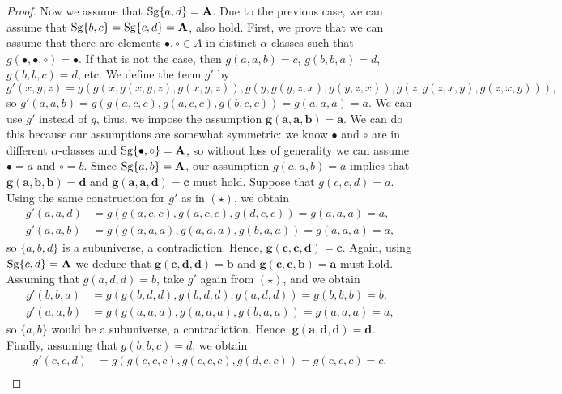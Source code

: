 \documentclass[11pt]{amsart}
\newcommand{\m}[1]{\mathbf{\uppercase{#1}}}
\theoremstyle{definition}
\theoremstyle{remark}
\theoremstyle{plain}
\begin{document}
\begin{proof}
Now we assume that $\mathrm{Sg}\{a,d\}=\m a$. Due to the previous case, we can assume that $\mathrm{Sg}\{b,c\}=\mathrm{Sg}\{c,d\}=\m a$, also hold. First, we prove that we can assume that there are elements $\bullet,\circ\in A$ in distinct $\alpha$-classes such that $g(\bullet,\bullet,\circ)=\bullet$. If that is not the case, then $g(a,a,b)=c$, $g(b,b,a)=d$, $g(b,b,c)=d$, etc. We define the term $g'$ by 
\begin{equation*}\tag{$\star$}
g'(x,y,z)=g(g(x,g(x,y,z),g(x,y,z)),g(y,g(y,z,x),g(y,z,x)),g(z,g(z,x,y),g(z,x,y))),
\end{equation*}
so $g'(a,a,b)=g(g(a,c,c),g(a,c,c),g(b,c,c))=g(a,a,a)=a$. We can use $g'$ instead of $g$, thus, we impose the assumption $\mathbf{g(a,a,b)=a}$. We can do this because our assumptions are somewhat symmetric: we know $\bullet$ and $\circ$ are in different $\alpha$-classes and $\mathrm{Sg}\{\bullet,\circ\}=\m a$, so without loss of generality we can assume $\bullet=a$ and $\circ=b$. Since $\mathrm{Sg}\{a,b\}=\m a$, our assumption $g(a,a,b)=a$ implies that $\mathbf{g(a,b,b)=d}$ and $\mathbf{g(a,a,d)=c}$ must hold. Suppose that $g(c,c,d)=a$. Using the same construction for $g'$ as in $(\star)$, we obtain
\begin{equation*}\tag{$\Box$}
\begin{aligned}
    g'(a,a,d)&=g(g(a,c,c),g(a,c,c),g(d,c,c))=g(a,a,a)=a,\\
    g'(a,a,b)&=g(g(a,a,a),g(a,a,a),g(b,a,a))=g(a,a,a)=a,
\end{aligned}
\end{equation*}
so $\{a,b,d\}$ is a subuniverse, a contradiction. Hence, $\mathbf{g(c,c,d)=c}$. Again, using $\mathrm{Sg}\{c,d\}=\m a$ we deduce that $\mathbf{g(c,d,d)=b}$ and $\mathbf{g(c,c,b)=a}$ must hold. Assuming that $g(a,d,d)=b$, take $g'$ again from $(\star)$, and we obtain
\begin{equation*}
\begin{aligned}
    g'(b,b,a)&=g(g(b,d,d),g(b,d,d),g(a,d,d))=g(b,b,b)=b,\\
    g'(a,a,b)&=g(g(a,a,a),g(a,a,a),g(b,a,a))=g(a,a,a)=a,
\end{aligned}
\end{equation*}
so $\{a,b\}$ would be a subuniverse, a contradiction. Hence, $\mathbf{g(a,d,d)=d}$. Finally, assuming that $g(b,b,c)=d$, we obtain
\begin{equation*}
\begin{aligned}
    g'(c,c,d)&=g(g(c,c,c), g(c,c,c), g(d,c,c))=g(c,c,c)=c,\\

\end{aligned}
\end{equation*}
\end{proof}
\end{document}
